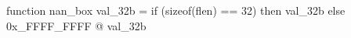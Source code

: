 function nan_box   val_32b =
  if (sizeof(flen) == 32)
  then val_32b
  else 0x_FFFF_FFFF @ val_32b
